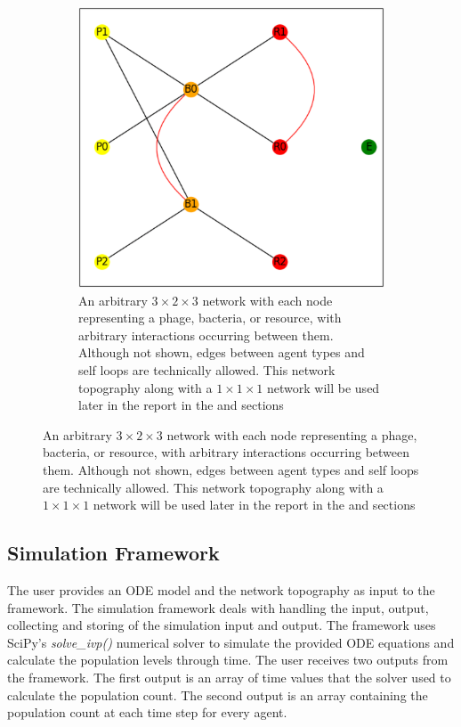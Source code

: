 \begin{figure}
\begin{subfigure}{0.49\linewidth}
        \includegraphics[width=\linewidth]{Screenshots/example_network.png}
        \caption{
            An arbitrary $3\times2\times3$ network with each node representing a phage, bacteria, or resource, with arbitrary interactions occurring between them. 
            Although not shown, edges between agent types and self loops are technically allowed. 
            This network topography along with a $1 \times 1 \times 1$ network will be used later in the report in the  and  sections
        }
        \label{fig:ss:example_network}
    \end{subfigure} 
 \end{figure}

\subsection{Simulation Framework}
\label{sec:simulation_framework}
The user provides an ODE model and the network topography as input to the framework. 
The simulation framework deals with handling the input, output, collecting and storing of the simulation input and output.
The framework uses SciPy's \cite{virtanenSciPy10Fundamental2020} \textit{solve\_ivp()} numerical solver \cite{ dormandFamilyEmbeddedRungeKutta1980} to simulate the provided ODE equations and calculate the population levels through time.
The user receives two outputs from the framework. 
The first output is an array of time values that the solver used to calculate the population count.
The second output is an array containing the population count at each time step for every agent.

